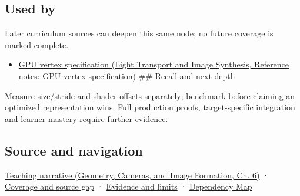 \subsection{Used by}\label{appendix-26bf6bf2fb8b-used-by}

\hypertarget{appendix-26bf6bf2fb8b-used-by}{}

Later curriculum sources can deepen this same node; no future coverage is marked complete.

\begin{itemize}
\tightlist
\item
  \href{../04-Light-Transport-and-Image-Synthesis/main.pdf\#nameddest=appendix-749ba51a6c25}{GPU vertex specification (Light Transport and Image Synthesis, Reference notes: GPU vertex specification)} \#\# Recall and next depth
\end{itemize}

Measure size/stride and shader offsets separately; benchmark before claiming an optimized representation wins. Full production proofs, target-specific integration and learner mastery require further evidence.

\subsection{Source and navigation}\label{appendix-26bf6bf2fb8b-source-and-navigation}

\hypertarget{appendix-26bf6bf2fb8b-source-and-navigation}{}

\href{../03-Geometry-Cameras-and-Image-Formation/main.pdf\#nameddest=02-foundations-ii-ch037-storage-and-computation-can-choose-different-layouts}{Teaching narrative (Geometry, Cameras, and Image Formation, Ch. 6)} · \hyperref[appendix-fd090d982a15-phase-6---parts-501-600]{Coverage and source gap} · \hyperref[appendix-a103e7846d21-phase-6---source-analysis-and-verification]{Evidence and limits} · \hyperref[appendix-4ad47bdd269a]{Dependency Map}
